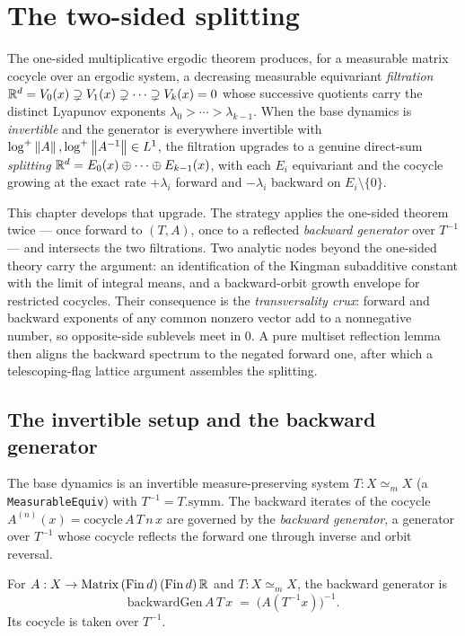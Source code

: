 \chapter{The two-sided splitting}
\label{chap:twosided}

The one-sided multiplicative ergodic theorem produces, for a measurable matrix cocycle over an ergodic system, a decreasing measurable equivariant \emph{filtration} \(\mathbb{R}^d = V_0(x) \supsetneq V_1(x) \supsetneq \cdots \supsetneq V_k(x) = 0\) whose successive quotients carry the distinct Lyapunov exponents \(\lambda_0 > \cdots > \lambda_{k-1}\). When the base dynamics is \emph{invertible} and the generator is everywhere invertible with \(\log^+\left\lVert A \right\rVert, \log^+\left\lVert A^{-1} \right\rVert \in L^1\), the filtration upgrades to a genuine direct-sum \emph{splitting} \(\mathbb{R}^d = E_0(x) \oplus \cdots \oplus E_{k-1}(x)\), with each \(E_i\) equivariant and the cocycle growing at the exact rate \(+\lambda_i\) forward and \(-\lambda_i\) backward on \(E_i \setminus \{0\}\).

This chapter develops that upgrade. The strategy applies the one-sided theorem twice — once forward to \((T, A)\), once to a reflected \emph{backward generator} over \(T^{-1}\) — and intersects the two filtrations. Two analytic nodes beyond the one-sided theory carry the argument: an identification of the Kingman subadditive constant with the limit of integral means, and a backward-orbit growth envelope for restricted cocycles. Their consequence is the \emph{transversality crux}: forward and backward exponents of any common nonzero vector add to a nonnegative number, so opposite-side sublevels meet in \(0\). A pure multiset reflection lemma then aligns the backward spectrum to the negated forward one, after which a telescoping-flag lattice argument assembles the splitting.

\section{The invertible setup and the backward generator}

The base dynamics is an invertible measure-preserving system \(T : X \simeq_m X\) (a \texttt{MeasurableEquiv}) with \(T^{-1} = T.\mathrm{symm}\). The backward iterates of the cocycle \(A^{(n)}(x) = \mathrm{cocycle}\,A\,T\,n\,x\) are governed by the \emph{backward generator}, a generator over \(T^{-1}\) whose cocycle reflects the forward one through inverse and orbit reversal.

\begin{definition}\label{backwardGen}
  \leanok
  For \(A : X \to \mathrm{Matrix}\,(\mathrm{Fin}\,d)\,(\mathrm{Fin}\,d)\,\mathbb{R}\) and \(T : X \simeq_m X\), the backward generator is
  \[
    \mathrm{backwardGen}\,A\,T\,x \;=\; \bigl(A(T^{-1}x)\bigr)^{-1}.
  \]
  Its cocycle is taken over \(T^{-1}\).
\end{definition}

